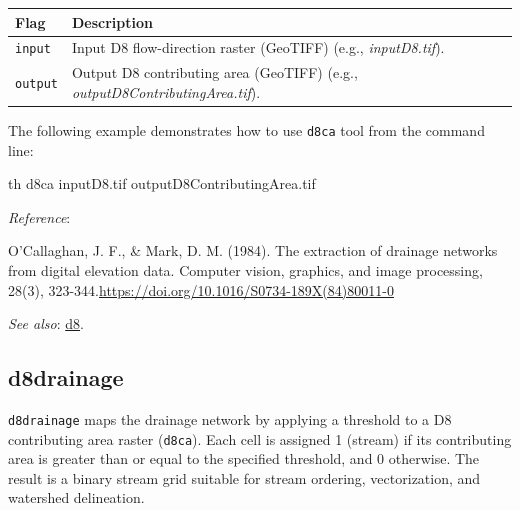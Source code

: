 \documentclass[
]{book}
\newenvironment{Shaded}{\begin{snugshade}}{\end{snugshade}}
\newcommand{\ExtensionTok}[1]{#1}
\newcommand{\NormalTok}[1]{#1}
\theoremstyle{definition}
\theoremstyle{definition}
\theoremstyle{definition}
\theoremstyle{definition}
\theoremstyle{remark}
\begin{document}
\begin{longtable}[]{@{}
  >{\raggedright\arraybackslash}p{}
  >{\raggedright\arraybackslash}p{}@{}}
\toprule\noalign{}
\begin{minipage}[b]{\linewidth}\raggedright
Flag
\end{minipage} & \begin{minipage}[b]{\linewidth}\raggedright
Description
\end{minipage} \\
\midrule\noalign{}
\endhead
\bottomrule\noalign{}
\endlastfoot
\texttt{input} & Input D8 flow-direction raster (GeoTIFF) (e.g., \emph{inputD8.tif}). \\
\texttt{output} & Output D8 contributing area (GeoTIFF) (e.g., \emph{outputD8ContributingArea.tif}). \\
\end{longtable}

The following example demonstrates how to use \texttt{d8ca} tool from the command line:

\begin{Shaded}
\begin{Highlighting}[]
\ExtensionTok{th}\NormalTok{ d8ca inputD8.tif outputD8ContributingArea.tif}
\end{Highlighting}
\end{Shaded}

\emph{Reference}:

O'Callaghan, J. F., \& Mark, D. M. (1984). The extraction of drainage networks from digital elevation data. Computer vision, graphics, and image processing, 28(3), 323-344.\url{https://doi.org/10.1016/S0734-189X(84)80011-0}

\emph{See also}: \hyperref[d8]{d8}.

\subsection{d8drainage}\label{d8drainage}

\texttt{d8drainage} maps the drainage network by applying a threshold to a D8 contributing area raster (\texttt{d8ca}). Each cell is assigned 1 (stream) if its contributing area is greater than or equal to the specified threshold, and 0 otherwise. The result is a binary stream grid suitable for stream ordering, vectorization, and watershed delineation.
\end{document}
